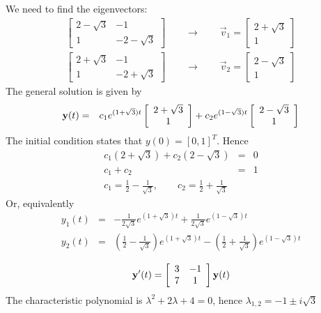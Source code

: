 We need to find the eigenvectors:
\begin{eqnarray*}
\left[\begin{array}{cc}2-\sqrt{3}&-1\\1&-2-\sqrt{3}\end{array}\right]\qquad\rightarrow\qquad
\vec{v}_1=\left[\begin{array}{c}2+\sqrt{3}\\1\end{array}\right]\\
\left[\begin{array}{cc}2+\sqrt{3}&-1\\1&-2+\sqrt{3}\end{array}\right]\qquad\rightarrow\qquad
\vec{v}_2=\left[\begin{array}{c}2-\sqrt{3}\\1\end{array}\right]
\end{eqnarray*}
The general solution is given by
\begin{eqnarray*}
{\bf y}(t)&=&c_1e^{(1+\sqrt{3})t}\left[\begin{array}{c}2+\sqrt{3}\\ 1\end{array}\right] + c_2e^{(1-\sqrt{3})t}\left[\begin{array}{c}2-\sqrt{3}\\1\end{array}\right]
\end{eqnarray*}
The initial condition states that $y(0)=[0,1]^T$. Hence
\begin{eqnarray*}
  c_1(2+\sqrt{3})+c_2(2-\sqrt{3})&=&0\\c_1+c_2&=&1\\
	c_1=\frac{1}{2}-\frac{1}{\sqrt{3}},\qquad c_2=\frac{1}{2}+\frac{1}{\sqrt{3}}
\end{eqnarray*}
Or, equivalently
\begin{eqnarray*}
y_1(t)&=&-\frac{1}{2\sqrt{3}} e^{(1+\sqrt{3})t} + \frac{1}{2\sqrt{3}}e^{(1-\sqrt{3})t}\\
y_2(t)&=&\left(\frac{1}{2}-\frac{1}{\sqrt{3}}\right)e^{(1+\sqrt{3})t} - \left(\frac{1}{2}+\frac{1}{\sqrt{3}}\right) e^{(1-\sqrt{3})t}
\end{eqnarray*}

\vspace{2mm}
$$
{\bf y}'(t)=\left[\begin{array}{cc}3&-1\\7&1\end{array}\right]{\bf y}(t)
$$
The characteristic polynomial is $\lambda^2+2\lambda+4=0$, hence $\lambda_{1,2}=-1\pm i\sqrt{3}$

